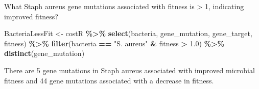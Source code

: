 \documentclass[
]{article}
\newenvironment{Shaded}{\begin{snugshade}}{\end{snugshade}}
\newcommand{\FloatTok}[1]{\textcolor[rgb]{0.00,0.00,0.81}{#1}}
\newcommand{\FunctionTok}[1]{\textcolor[rgb]{0.13,0.29,0.53}{\textbf{#1}}}
\newcommand{\NormalTok}[1]{#1}
\newcommand{\OtherTok}[1]{\textcolor[rgb]{0.56,0.35,0.01}{#1}}
\newcommand{\SpecialCharTok}[1]{\textcolor[rgb]{0.81,0.36,0.00}{\textbf{#1}}}
\newcommand{\StringTok}[1]{\textcolor[rgb]{0.31,0.60,0.02}{#1}}
\begin{document}
What Staph aureus gene mutations associated with fitness is
\textgreater{} 1, indicating improved fitness?

\begin{Shaded}
\begin{Highlighting}[]
\NormalTok{BacteriaLessFit }\OtherTok{\textless{}{-}}\NormalTok{ costR }\SpecialCharTok{\%\textgreater{}\%} 
  \FunctionTok{select}\NormalTok{(bacteria, gene\_mutation, gene\_target, fitness) }\SpecialCharTok{\%\textgreater{}\%} 
  \FunctionTok{filter}\NormalTok{(bacteria }\SpecialCharTok{==} \StringTok{"S. aureus"} \SpecialCharTok{\&}\NormalTok{ fitness }\SpecialCharTok{\textgreater{}} \FloatTok{1.0}\NormalTok{) }\SpecialCharTok{\%\textgreater{}\%} 
  \FunctionTok{distinct}\NormalTok{(gene\_mutation)}
\end{Highlighting}
\end{Shaded}

There are 5 gene mutations in Staph aureus associated with improved
microbial fitness and 44 gene mutations associated with a decrease in
fitness.
\end{document}
